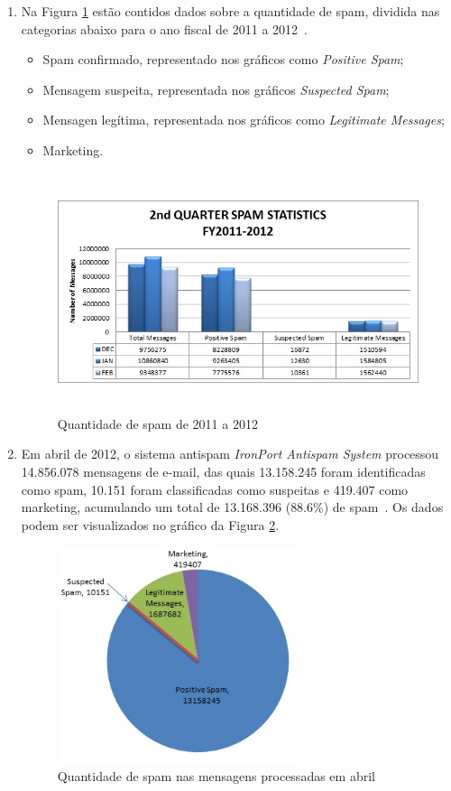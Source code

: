 \documentclass[a4paper,dvipdfm]{article}
\begin{document}
	\vspace{10pt}
	\begin{enumerate}
		\item
			Na Figura \ref{fig:spambar} estão contidos dados sobre a quantidade de spam, dividida nas categorias abaixo para o ano fiscal de 2011 a 2012~\cite{spam:stats}.
		\begin{itemize}
			\item Spam confirmado, representado nos gráficos como \emph{Positive Spam};
			\item Mensagem suspeita, representada nos gráficos \emph{Suspected Spam};
			\item Mensagen legítima, representada nos gráficos como \emph{Legitimate Messages};
			\item Marketing.
		\end{itemize}
	
		\begin{figure}[h!]
			\centering
			\includegraphics[height=7cm]{Imagens/spam/2ndQtr-FY2011-12.jpg}
			\caption{Quantidade de spam de 2011 a 2012}
			\label{fig:spambar}
		\end{figure}
	
	\item
		Em abril de 2012, o sistema antispam \emph{IronPort Antispam System} processou 14.856.078 mensagens de e-mail, das quais 13.158.245 foram identificadas como spam, 10.151 foram classificadas como suspeitas e 419.407 como marketing, acumulando um total de 13.168.396 ($88.6\%$) de spam~\cite{spam:stats}.
		Os dados podem ser visualizados no gráfico da Figura \ref{fig:spampizza}.
	
		\begin{figure}[h!]
			\centering
			\includegraphics[width=7cm]{Imagens/spam/Apr2012-Spam.jpg}
			\caption{Quantidade de spam nas mensagens processadas em abril}
			\label{fig:spampizza}
		\end{figure}
	

\end{enumerate}
\end{document}
